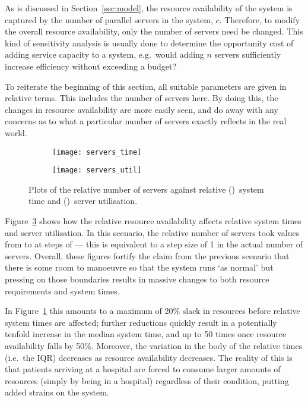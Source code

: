 As is discussed in Section~\ref{sec:model}, the resource availability of the
system is captured by the number of parallel servers in the system, \(c\).
Therefore, to modify the overall resource availability, only the number of
servers need be changed. This kind of sensitivity analysis is usually done to
determine the opportunity cost of adding service capacity to a system, e.g.\
would adding \(n\) servers sufficiently increase efficiency without exceeding
a budget?

To reiterate the beginning of this section, all suitable parameters are given in
relative terms. This includes the number of servers here. By doing this, the
changes in resource availability are more easily seen, and do away with any
concerns as to what a particular number of servers exactly reflects in the real
world.

\begin{figure}
    \centering
    \begin{subfigure}{.5\imgwidth}
        \texttt{[image: servers\_time]}
        \caption{}\label{fig:servers_time}
    \end{subfigure}\hfill%
    \begin{subfigure}{.5\imgwidth}
        \texttt{[image: servers\_util]}
        \caption{}\label{fig:servers_util}
    \end{subfigure}
    \caption{%
        Plots of the relative number of servers against relative
        (\subref{fig:servers_time})~system time and
        ()~server utilisation.
    }\label{fig:servers}
\end{figure}

Figure~\ref{fig:servers} shows how the relative resource availability affects
relative system times and server utilisation. In this scenario, the relative
number of servers took values from  to
 at steps of
 --- this is equivalent to a step size of 1
in the actual number of servers. Overall, these figures fortify the
claim from the previous scenario that there is some room to manoeuvre so that
the system runs `as normal' but pressing on those boundaries results in massive
changes to both resource requirements and system times.

In Figure~\ref{fig:servers_time} this amounts to a maximum of 20\% slack in
resources before relative system times are affected; further reductions quickly
result in a potentially tenfold increase in the median system time, and up to 50
times once resource availability falls by 50\%. Moreover, the variation in the
body of the relative times (i.e.\ the IQR) decreases as resource availability
decreases. The reality of this is that patients arriving at a hospital are
forced to consume larger amounts of resources (simply by being in a hospital)
regardless of their condition, putting added strains on the system.

